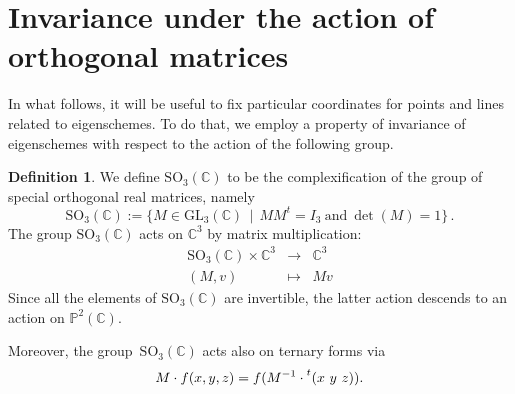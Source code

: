 \documentclass{amsart}
\theoremstyle{plain}
\theoremstyle{definition}
\newtheorem{definition}[lemma]{Definition}
\newcommand{\C}{\mathbb{C}}
\newcommand{\p}{\mathbb{P}}
\begin{document}
\section{Invariance under the action of orthogonal matrices}
\label{invariance}

In what follows, it will be useful to fix particular coordinates for points and lines related to eigenschemes. To do that, we employ a property of invariance of eigenschemes with respect to the action of the following group.

\begin{definition}
 We define $\mathrm{SO}_3(\mathbb{C})$ to be the complexification of the group of special orthogonal real matrices, namely
 \[
  \mathrm{SO}_3(\mathbb{C}) :=
  \bigl\{
   M \in \mathrm{GL}_3(\C) \, \mid \,
   M M^t = I_3 \ \text{and} \ \det(M) = 1
  \bigr\} \,.
 \]
 The group $\mathrm{SO}_3(\mathbb{C})$ acts on $\C^3$ by matrix multiplication:
 \[
  \begin{array}{ccc}
   \mathrm{SO}_3(\mathbb{C}) \times \C^3 & \rightarrow & \C^3 \\
   (M, v) & \mapsto & Mv
  \end{array}
 \]
 Since all the elements of $\mathrm{SO}_3(\mathbb{C})$ are invertible, the latter action descends to an action on $\p^2(\C)$.

 Moreover, the group~$\mathrm{SO}_3(\mathbb{C})$ acts also on ternary forms via
 \[
  M \cdot f (x,y,z) = f(M^{-1} \cdot \prescript{t} {}( x \ y \ z ) ).
 \]
\end{definition}
\end{document}
